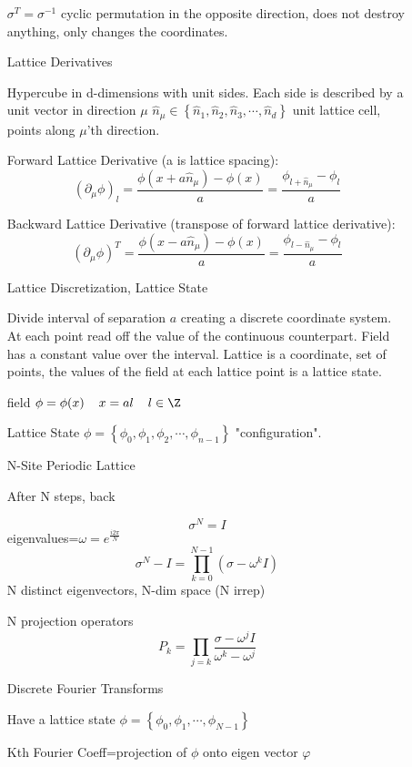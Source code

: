 \begin{description}
\begin{itemize}
$\sigma^T=\sigma^{-1}$ cyclic permutation in the opposite direction, does not destroy anything, only changes the coordinates.

\item[Lattice Derivatives]

Hypercube in d-dimensions with unit sides. Each side is described by a unit vector in direction $\mu$ $\hat{n}_{\mu}\in\left\lbrace \hat{n}_1,\hat{n}_2,\hat{n}_3,\cdots,\hat{n}_d\right\rbrace$ unit lattice cell, points along $\mu$'th direction. 

Forward Lattice Derivative (a is lattice spacing):
$$\left(\partial_{\mu}\phi\right)_l=\frac{\phi(x+a\hat{n}_{\mu})-\phi(x)}{a}=\frac{\phi_{l+\hat{n}_{\mu}}-\phi_l}{a}$$

Backward Lattice Derivative (transpose of forward lattice derivative):
$$\left(\partial_{\mu}\phi\right)^T=\frac{\phi(x-a\hat{n}_{\mu})-\phi(x)}{a}=\frac{\phi_{l-\hat{n}_{\mu}}-\phi_l}{a}$$

\item[Lattice Discretization, Lattice State]

Divide interval of separation $a$ creating a discrete coordinate system. At each point read off the value of the continuous counterpart. Field has a constant value over the interval. Lattice is a coordinate, set of points, the values of the field at each lattice point is a lattice state.

field $\phi=\phi(x)\hspace{4mm}x=al\hspace{4mm}l\in\Z$

Lattice State $\phi=\left\lbrace \phi_0,\phi_1,\phi_2,\cdots,\phi_{n-1}\right\rbrace$ "configuration".

\item[N-Site Periodic Lattice]

After N steps, back

$$\sigma^N=I$$ 
eigenvalues=$\omega=e^{\frac{i2\pi}{N}}$
$$\sigma^N-I=\prod_{k=0}^{N-1}(\sigma-\omega^kI)$$
N distinct eigenvectors, N-dim space (N irrep)

N projection operators
$$P_k=\prod_{j=k}\frac{\sigma-\omega^jI}{\omega^k-\omega^j}$$

\item[Discrete Fourier Transforms]

Have a lattice state $\phi=\left\lbrace \phi_0,\phi_1,\cdots,\phi_{N-1} \right\rbrace$

Kth Fourier Coeff=projection of $\phi$ onto eigen vector $\varphi$


\end{itemize}
\end{description}

